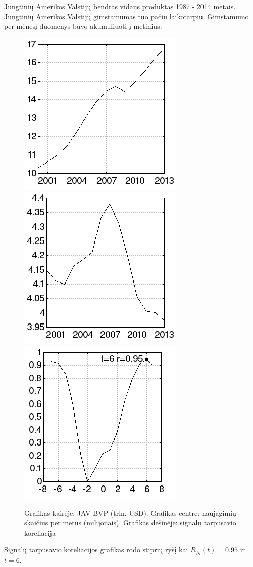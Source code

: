 Jungtinių Amerikos Valstijų bendras vidaus produktas\cite{gdp} 1987 - 2014 metais.
Jungtinių Amerikos Valstijų gimstamumas\cite{births} tuo pačiu laikotarpiu.
Gimstamumo per mėnesį duomenys buvo akumuliuoti į metinius.

\begin{figure}
\includegraphics[scale=0.65]{../scripts/gdp_births/gdp.png}
\includegraphics[scale=0.65]{../scripts/gdp_births/births.png}
\includegraphics[scale=0.65]{../scripts/gdp_births/result.png}
    \caption{Grafikas kairėje: JAV BVP (trln. USD). Grafikas centre: naujagimių skaičius per metus (milijonais). Grafikas dešinėje: signalų tarpusavio koreliacija}
\end{figure}

Signalų tarpusavio koreliacijos grafikas rodo stiprių ryšį kai \( R_{fg}(t) = 0.95 \) ir \( t = 6 \).

